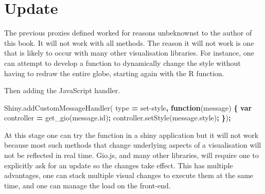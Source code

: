 \documentclass[
]{krantz}
\makeatletter
\newenvironment{Shaded}{\begin{snugshade}}{\end{snugshade}}
\newcommand{\AttributeTok}[1]{\textcolor[rgb]{0.61,0.61,0.61}{#1}}
\newcommand{\CommentTok}[1]{\textcolor[rgb]{0.37,0.37,0.37}{\textit{#1}}}
\newcommand{\ControlFlowTok}[1]{\textcolor[rgb]{0.27,0.27,0.27}{\textbf{#1}}}
\newcommand{\DataTypeTok}[1]{\textcolor[rgb]{0.27,0.27,0.27}{#1}}
\newcommand{\KeywordTok}[1]{\textcolor[rgb]{0.27,0.27,0.27}{\textbf{#1}}}
\newcommand{\NormalTok}[1]{#1}
\newcommand{\OperatorTok}[1]{\textcolor[rgb]{0.43,0.43,0.43}{\textbf{#1}}}
\newcommand{\StringTok}[1]{\textcolor[rgb]{0.5,0.5,0.5}{#1}}
\newcommand{\VariableTok}[1]{\textcolor[rgb]{0,0,0}{#1}}
\newenvironment{kframe}{%
\medskip{}
\setlength{\fboxsep}{.8em}
 \def\at@end@of@kframe{}%
 \ifinner\ifhmode%
  \def\at@end@of@kframe{\end{minipage}}%
  \begin{minipage}{\columnwidth}%
 \fi\fi%
 \def\FrameCommand##1{\hskip\@totalleftmargin \hskip-\fboxsep
 \colorbox{shadecolor}{##1}\hskip-\fboxsep
     \hskip-\linewidth \hskip-\@totalleftmargin \hskip\columnwidth}%
 \MakeFramed {\advance\hsize-\width
   \@totalleftmargin\z@ \linewidth\hsize
   \@setminipage}}%
 {\par\unskip\endMakeFramed%
 \at@end@of@kframe}
\renewenvironment{Shaded}{\begin{kframe}}{\end{kframe}}
\makeatother
\begin{document}
\hypertarget{update}{%
\section{Update}\label{update}}

The previous proxies defined worked for reasons unbeknownst to the author of this book. It will not work with all methods. The reason it will not work is one that is likely to occur with many other visualisation libraries. For instance, one can attempt to develop a function to dynamically change the style without having to redraw the entire globe, starting again with the R function.

\begin{Shaded}
\end{Shaded}

Then adding the JavaScript handler.

\begin{Shaded}
\begin{Highlighting}[]
\VariableTok{Shiny}\NormalTok{.}\AttributeTok{addCustomMessageHandler}\NormalTok{(}
\NormalTok{  type }\OperatorTok{=} \StringTok{\textquotesingle{}set{-}style\textquotesingle{}}\OperatorTok{,} \KeywordTok{function}\NormalTok{(message) }\OperatorTok{\{}
    \KeywordTok{var}\NormalTok{ controller }\OperatorTok{=} \AttributeTok{get\_gio}\NormalTok{(}\VariableTok{message}\NormalTok{.}\AttributeTok{id}\NormalTok{)}\OperatorTok{;}
    \VariableTok{controller}\NormalTok{.}\AttributeTok{setStyle}\NormalTok{(}\VariableTok{message}\NormalTok{.}\AttributeTok{style}\NormalTok{)}\OperatorTok{;}
\OperatorTok{\}}\NormalTok{)}\OperatorTok{;}
\end{Highlighting}
\end{Shaded}

At this stage one can try the function in a shiny application but it will not work because most such methods that change underlying aspects of a visualisation will not be reflected in real time. Gio.js, and many other libraries, will require one to explicitly ask for an update so the changes take effect. This has multiple advantages, one can stack multiple visual changes to execute them at the same time, and one can manage the load on the front-end.
\end{document}
